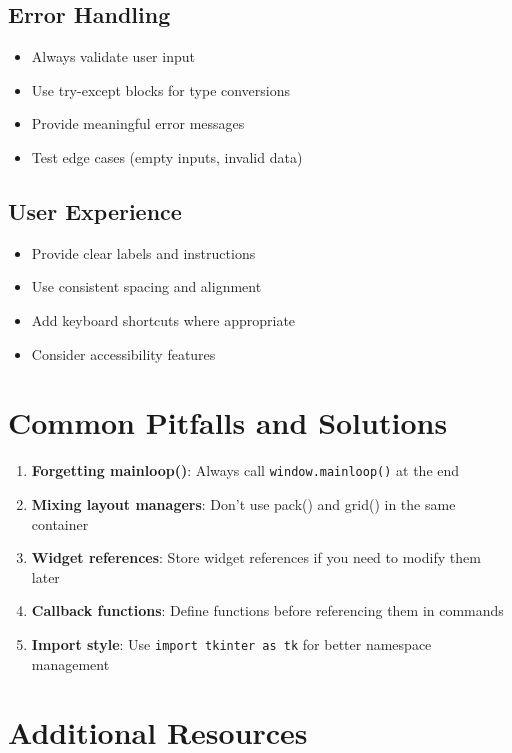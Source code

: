 \documentclass[12pt,a4paper]{article}
\begin{document}
\subsection{Error Handling}
\begin{itemize}
    \item Always validate user input
    \item Use try-except blocks for type conversions
    \item Provide meaningful error messages
    \item Test edge cases (empty inputs, invalid data)
\end{itemize}

\subsection{User Experience}
\begin{itemize}
    \item Provide clear labels and instructions
    \item Use consistent spacing and alignment
    \item Add keyboard shortcuts where appropriate
    \item Consider accessibility features
\end{itemize}

\section{Common Pitfalls and Solutions}

\begin{enumerate}
    \item \textbf{Forgetting mainloop()}: Always call \texttt{window.mainloop()} at the end
    \item \textbf{Mixing layout managers}: Don't use pack() and grid() in the same container
    \item \textbf{Widget references}: Store widget references if you need to modify them later
    \item \textbf{Callback functions}: Define functions before referencing them in commands
    \item \textbf{Import style}: Use \texttt{import tkinter as tk} for better namespace management
\end{enumerate}

\section{Additional Resources}
\end{document}
